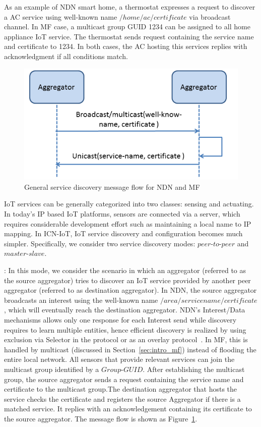 As an example of NDN smart home, a thermostat expresses a request to
discover a AC service using well-known name $/home/ac/certificate$ via
broadcast channel.  In MF case, a multicast group GUID 1234 can be
assigned to all home appliance IoT service.  The thermostat sends
request containing the service name and certificate to 1234.  In both
cases, the AC hosting this services replies with acknowledgment if
all conditions match.
\begin{figure}
\includegraphics[width=\columnwidth]{figure/service_discovery.png}
\caption{\label{fig:ser_dis}General service discovery message flow for NDN and MF}
\end{figure}
\iffalse
IoT services can be generally categorized into two classes: sensing and actuating. In today's IP based IoT platforms, sensors are connected via a server, which requires considerable development effort such as maintaining a local name to IP mapping. In ICN-IoT, IoT service discovery and configuration becomes much simpler. Specifically, we consider two service discovery modes: $peer$-$to$-$peer$ and $master$-$slave$.


\vspace{1mm}: In this mode, we consider the scenario in which an aggregator (referred to as the source aggregator) tries to discover an IoT service provided by another peer aggregator (referred to as destination aggregator). In NDN, the source aggregator broadcasts an interest using the well-known name $/area/servicename/certificate$, which will eventually reach the destination aggregator. NDN's Interest/Data mechanisms allows only one response for each Interest send while discovery requires to learn multiple entities, hence efficient discovery is realized by using exclusion via Selector in the protocol or as an overlay protocol~\cite{ravindran2013information}. In MF, this is handled by multicast (discussed in Section~\ref{sec:intro_mf}) instead of flooding the entire local network. All sensors that provide relevant services can join the multicast group identified by a $Group$-$GUID$. After establishing the multicast group, the source aggregator sends a request containing the service name and certificate to the multicast group.The destination aggregator that hosts the service checks the certificate and registers the source Aggregator if there is a matched service. It replies with an acknowledgement containing its certificate to the source aggregator. The message flow is shown as Figure~\ref{fig:ser_dis}.

